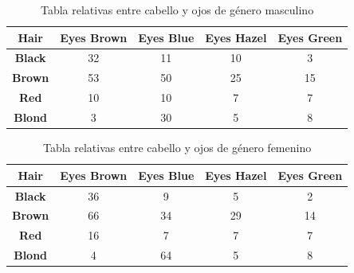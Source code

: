 \documentclass[12pt,a4paper]{article}
\begin{document}
\begin{table}[h]
\centering
\label{Correlacion}
\begin{tabular}{|c|c|c|c|c|}
\hline
\textbf{Hair}  & \textbf{Eyes Brown} & \textbf{Eyes Blue} & \textbf{Eyes Hazel} & \textbf{Eyes Green} \\ \hline
\textbf{Black} & 32                  & 11                 & 10                  & 3                   \\ \hline
\textbf{Brown} & 53                  & 50                 & 25                  & 15                  \\ \hline
\textbf{Red}   & 10                  & 10                 & 7                   & 7                   \\ \hline
\textbf{Blond} & 3                   & 30                 & 5                   & 8                   \\ \hline
\end{tabular}
\caption{Tabla relativas entre cabello y ojos de género masculino}
\label{f:FMale}
\end{table}

\begin{table}[ht]
\centering
\label{Correlacion2}
\begin{tabular}{|c|c|c|c|c|}
\hline
\textbf{Hair}  & \textbf{Eyes Brown} & \textbf{Eyes Blue} & \textbf{Eyes Hazel} & \textbf{Eyes Green} \\ \hline
\textbf{Black} & 36                  & 9                  & 5                   & 2                   \\ \hline
\textbf{Brown} & 66                  & 34                 & 29                  & 14                  \\ \hline
\textbf{Red}   & 16                  & 7                  & 7                   & 7                   \\ \hline
\textbf{Blond} & 4                   & 64                 & 5                   & 8                   \\ \hline
\end{tabular}
\caption{Tabla relativas entre cabello y ojos de género femenino}
\label{f:FFemale}
\end{table}
\end{document}
